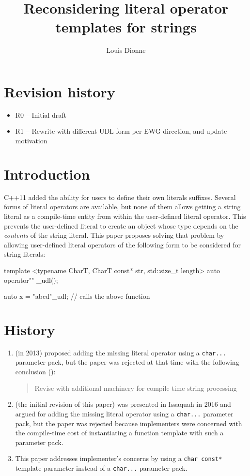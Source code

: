 \documentclass{wg21}
\title{Reconsidering literal operator templates for strings}
\author{Louis Dionne}{ldionne.2@gmail.com}
\newcommand{\cc}[1]{\texttt{#1}}
\begin{document}
\maketitle


\section{Revision history}
\begin{itemize}
  \item R0 -- Initial draft
  \item R1 -- Rewrite with different UDL form per EWG direction, and update motivation
\end{itemize}


\section{Introduction}
C++11 added the ability for users to define their own literals suffixes.
Several forms of literal operators are available, but none of them allows
getting a string literal as a compile-time entity from within the user-defined
literal operator. This prevents the user-defined literal to create an object
whose type depends on the \emph{contents} of the string literal. This paper
proposes solving that problem by allowing user-defined literal operators of
the following form to be considered for string literals:

\begin{cpp}
template <typename CharT, CharT const* str, std::size_t length>
auto operator"" _udl();

auto x = "abcd"_udl; // calls the above function
\end{cpp}


\section{History}
\begin{enumerate}
  \item \cite{N3599} (in 2013) proposed adding the missing literal operator
        using a \cc{char...} parameter pack, but the paper was rejected at
        that time with the following conclusion (\cite{CWG66}):
        \begin{quote}
          Revise with additional machinery for compile time string processing
        \end{quote}
  \item \cite{P0424R0} (the initial revision of this paper) was presented in
        Issaquah in 2016 and argued for adding the missing literal operator
        using a \cc{char...} parameter pack, but the paper was rejected
        because implementers were concerned with the compile-time cost of
        instantiating a function template with such a parameter pack.
  \item This paper addresses implementer's concerns by using a \cc{char const*}
        template parameter instead of a \cc{char...} parameter pack.
\end{enumerate}
\end{document}
